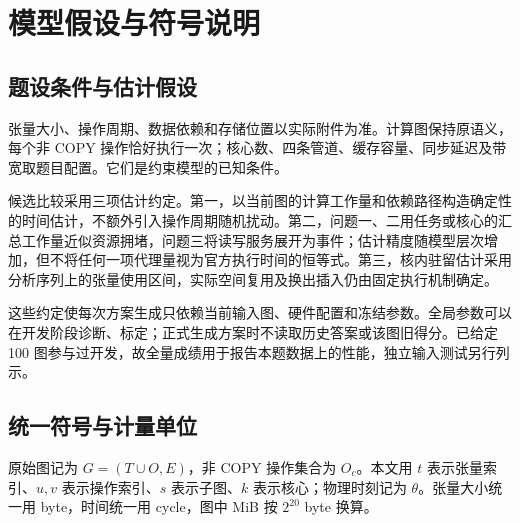\section{模型假设与符号说明}

\subsection{题设条件与估计假设}
张量大小、操作周期、数据依赖和存储位置以实际附件为准。计算图保持原语义，每个非 COPY 操作恰好执行一次；核心数、四条管道、缓存容量、同步延迟及带宽取题目配置。它们是约束模型的已知条件。

候选比较采用三项估计约定。第一，以当前图的计算工作量和依赖路径构造确定性的时间估计，不额外引入操作周期随机扰动。第二，问题一、二用任务或核心的汇总工作量近似资源拥堵，问题三将读写服务展开为事件；估计精度随模型层次增加，但不将任何一项代理量视为官方执行时间的恒等式。第三，核内驻留估计采用分析序列上的张量使用区间，实际空间复用及换出插入仍由固定执行机制确定。

这些约定使每次方案生成只依赖当前输入图、硬件配置和冻结参数。全局参数可以在开发阶段诊断、标定；正式生成方案时不读取历史答案或该图旧得分。已给定 100 图参与过开发，故全量成绩用于报告本题数据上的性能，独立输入测试另行列示。

\subsection{统一符号与计量单位}
原始图记为 $G=(T\cup O,E)$，非 COPY 操作集合为 $O_c$。本文用 $t$ 表示张量索引、$u,v$ 表示操作索引、$s$ 表示子图、$k$ 表示核心；物理时刻记为 $\theta$。张量大小统一用 byte，时间统一用 cycle，图中 MiB 按 $2^{20}$ byte 换算。

